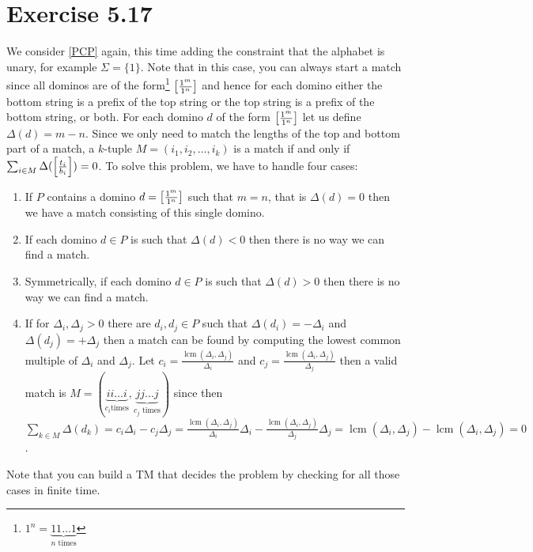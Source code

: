 \documentclass{article}
\begin{document}
\section{Exercise 5.17}
We consider \ref{PCP} again, this time adding the constraint that the alphabet
is unary, for example \(\Sigma = \{1\}\). Note that in this case, you can always start a
match since all dominos are of the form\footnote{\(1^n = \underbrace{11\ldots1}_{n \text{ times}}\)}
\(\mleft[\frac{1^m}{1^n}\mright]\)
and hence for each domino either the bottom string is a prefix of the top
string or the top string is a prefix of the bottom string, or both.
For each domino \(d\) of the form \(\mleft[\frac{1^m}{1^n}\mright]\) let us
define \(\Delta(d) = m - n\). Since we only need to match the lengths of the
top and bottom part of a match, a \(k\)-tuple \(M = (i_1,i_2,\ldots,i_k)\)
is a match if and only if \(\sum_{i \in M}
	\Delta(\mleft[\frac{t_i}{b_i}\mright]) = 0\).
To solve this problem, we have to handle four cases:
\begin{enumerate}
	\item If \(P\) contains a domino \(d=\mleft[\frac{1^m}{1^n}\mright]\) such that
		\(m=n\), that is \(\Delta(d) = 0\) then we have a match consisting of this single domino.
	\item If each domino \(d \in P\) is such that \(\Delta(d) < 0\) then there
		is no way we can find a match.
	\item Symmetrically, if each domino \(d \in P\) is such that \(\Delta(d) > 0\) then there
		is no way we can find a match.
	\item If for \(\Delta_i, \Delta_j > 0\) there are \(d_i,d_j \in P\) such
		that \(\Delta(d_i) = -\Delta_i\) and \(\Delta(d_j) = +\Delta_j\) then a
		match can be found by computing the lowest common multiple of
		\(\Delta_i\) and \(\Delta_j\). Let \(c_i =
			\frac{\mathop{lcm}(\Delta_i,\Delta_j)}{\Delta_i}\) and \(c_j =
			\frac{\mathop{lcm}(\Delta_i,\Delta_j)}{\Delta_j}\) then a valid
			match is \(M = (\underbrace{i i \ldots i}_{c_i \text{
							times}},\underbrace{j j \ldots j}_{c_j
			\text{ times}})\) since then \(\sum_{k \in M}
	\Delta(d_k) = c_i \Delta_i - c_j \Delta_j
= \frac{\mathop{lcm}(\Delta_i,\Delta_j)}{\Delta_i} \Delta_i -
\frac{\mathop{lcm}(\Delta_i,\Delta_j)}{\Delta_j} \Delta_j
=\mathop{lcm}(\Delta_i,\Delta_j) - \mathop{lcm}(\Delta_i,\Delta_j)
= 0\).
\end{enumerate}
Note that you can build a TM that decides the problem by checking for all those
cases in finite time.
\end{document}
